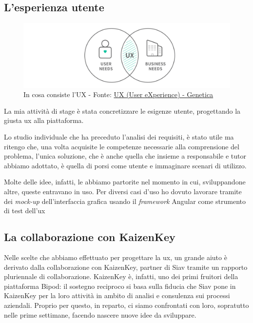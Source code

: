 \subsection{L'esperienza utente}
\begin{figure}[H]
    \centering
    \includegraphics[width=0.80\columnwidth]{immagini/uxneeds.png}
    \caption{In cosa consiste l'UX - Fonte: \href{https://www.genetica.marketing/user-experience-di-cosa-si-tratta/}{UX (User eXperience) - Genetica}}
    \label{fig:ux}
\end{figure}
La mia attività di stage è stata concretizzare le esigenze utente, progettando la giusta \acrshort{ux} alla piattaforma.

Lo studio individuale che ha preceduto l'analisi dei requisiti, è stato utile ma ritengo che, una volta acquisite le competenze necessarie alla comprensione del problema, l'unica soluzione, che è anche quella che insieme a responsabile e tutor abbiamo adottato, è quella di porsi come utente e immaginare scenari di utilizzo.

Molte delle idee, infatti, le abbiamo partorite nel momento in cui, sviluppandone altre, queste entravano in uso.
Per diversi casi d'uso ho dovuto lavorare tramite dei \textit{mock-up} dell'interfaccia grafica usando il \textit{framework} Angular come strumento di test dell'\acrlong{ux}
\newpage
\subsection{La collaborazione con KaizenKey}
Nelle scelte che abbiamo effettuato per progettare la \acrlong{ux}, un grande aiuto è derivato dalla collaborazione con KaizenKey, partner di Siav tramite un rapporto pluriennale di collaborazione. KaizenKey è, infatti, uno dei primi fruitori della piattaforma Bipod: il sostegno reciproco si basa sulla fiducia che Siav pone in KaizenKey per la loro attività in ambito di analisi e consulenza sui processi aziendali. Proprio per questo, in reparto, ci siamo confrontati con loro, sopratutto nelle prime settimane, facendo nascere nuove idee da sviluppare.

